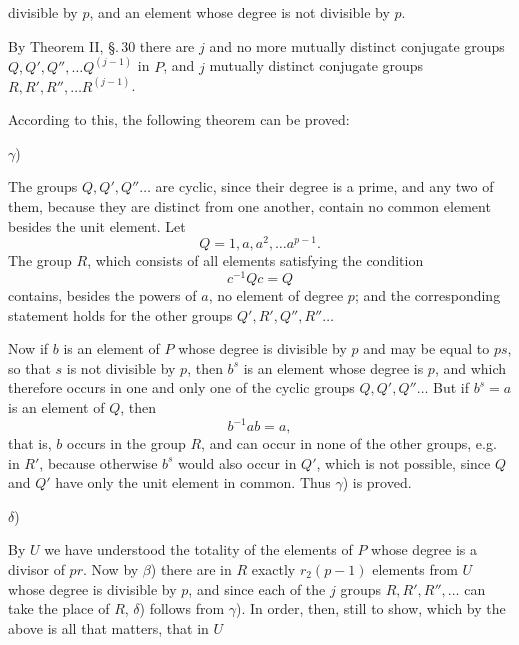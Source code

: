divisible by $p$, and an element whose degree is not divisible by $p$.

By Theorem II, \S.\,30 there are $j$ and no more mutually distinct conjugate groups $Q, Q', Q'', \ldots Q^{(j-1)}$ in $P$, and $j$ mutually distinct conjugate groups $R, R', R'', \ldots R^{(j-1)}$.

According to this, the following theorem can be proved:

$\gamma$) 

The groups $Q, Q', Q'' \ldots$ are cyclic, since their degree is a prime, and any two of them, because they are distinct from one another, contain no common element besides the unit element. Let
\[
Q = 1, a, a^2, \ldots a^{p-1}.
\]
The group $R$, which consists of all elements satisfying the condition
\[
c^{-1}Qc = Q
\]
contains, besides the powers of $a$, no element of degree $p$; and the corresponding statement holds for the other groups $Q', R', Q'', R'' \ldots$

Now if $b$ is an element of $P$ whose degree is divisible by $p$ and may be equal to $ps$, so that $s$ is not divisible by $p$, then $b^s$ is an element whose degree is $p$, and which therefore occurs in one and only one of the cyclic groups $Q, Q', Q'' \ldots$ But if $b^s = a$ is an element of $Q$, then
\[
b^{-1}ab = a,
\]
that is, $b$ occurs in the group $R$, and can occur in none of the other groups, e.g. in $R'$, because otherwise $b^s$ would also occur in $Q'$, which is not possible, since $Q$ and $Q'$ have only the unit element in common. Thus $\gamma$) is proved.

$\delta$) 

By $U$ we have understood the totality of the elements of $P$ whose degree is a divisor of $pr$. Now by $\beta$) there are in $R$ exactly $r_2(p-1)$ elements from $U$ whose degree is divisible by $p$, and since each of the $j$ groups $R, R', R'', \ldots$ can take the place of $R$, $\delta$) follows from $\gamma$). In order, then, still to show, which by the above is all that matters, that in $U$
